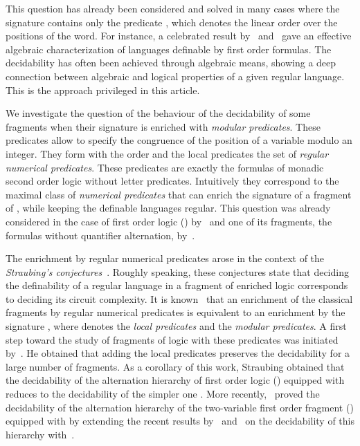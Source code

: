 \documentclass[submission,hidelink]{dmtcs-episciences}
\begin{document}
	This question has already been considered and solved in many cases where the signature
	contains only the predicate , which denotes the linear order over the positions of the word. For instance,
	a celebrated result by~\cite{Schutzenberger65} and~\cite{MP71}
	gave an effective algebraic characterization of languages definable by first order formulas.
	The decidability has often been achieved through
	algebraic means, showing a deep connection between algebraic and logical properties of
	a given regular language.
	This is the approach privileged in this article.

	We investigate the question of the behaviour of the decidability of some fragments
	when their signature is enriched with \emph{modular predicates}.
	These predicates allow to specify the congruence of the position of a variable modulo an integer.
	They form with the order and the local predicates the set of \emph{regular numerical predicates}.
	These predicates are exactly the formulas of monadic second order logic
	without letter predicates. Intuitively they correspond to the maximal
	class of \emph{numerical predicates} that can enrich the signature of a fragment of , while keeping the definable languages regular.
	This question was already considered in the case of first order logic () by~\cite{Bar92} and one
	of its fragments, the formulas without quantifier alternation, by~\cite{Pel92}.

	The enrichment by regular numerical predicates arose in the context of the
	\emph{Straubing's conjectures}~\citep{Straubing94}. Roughly speaking, these conjectures state that
	deciding the definability  of a regular language in a fragment of enriched logic corresponds to
	 deciding its circuit complexity.
	It is known~\citep{Pel92,Straubing94} that
	an enrichment of the classical fragments by regular numerical predicates is equivalent to an enrichment by the signature
	, where  denotes the \emph{local predicates}
	and  the \emph{modular predicates}.
	A first step toward  the study of fragments of logic with
	these predicates was initiated by~\cite{Straubing85}.
	He obtained  that
	adding the local predicates preserves the decidability for a large number of fragments. As a corollary
	of this work, Straubing obtained that the decidability of the alternation
	hierarchy of first order logic () equipped with  reduces to the
	decidability of the simpler one .
More recently,~\cite{KL13} proved the decidability of the
	alternation hierarchy of the two-variable first order
	fragment () equipped with  by extending the recent results by~\cite{KS12} and~\cite{KW12} on the
	decidability of this hierarchy with~.
\end{document}
